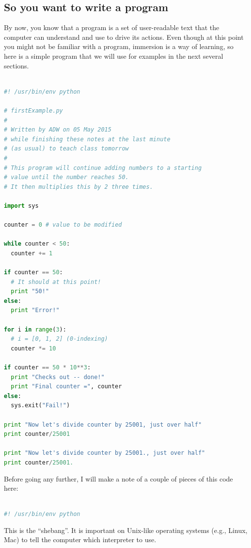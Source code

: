 \documentclass[a4paper,10pt]{scrartcl}
\begin{document}
\subsection{So you want to write a program}

By now, you know that a program is a set of user-readable text that the computer can understand and use to drive its actions. Even though at this point you might not be familiar with a program, immersion is a way of learning, so here is a simple program that we will use for examples in the next several sections.

\begin{lstlisting}[belowskip=-1.6\baselineskip, language=python]

#! /usr/bin/env python

# firstExample.py
# 
# Written by ADW on 05 May 2015
# while finishing these notes at the last minute
# (as usual) to teach class tomorrow
# 
# This program will continue adding numbers to a starting
# value until the number reaches 50.
# It then multiplies this by 2 three times.

import sys

counter = 0 # value to be modified

while counter < 50:
  counter += 1

if counter == 50:
  # It should at this point!
  print "50!"
else:
  print "Error!"
  
for i in range(3):
  # i = [0, 1, 2] (0-indexing)
  counter *= 10

if counter == 50 * 10**3:
  print "Checks out -- done!"
  print "Final counter =", counter
else:
  sys.exit("Fail!")
  
print "Now let's divide counter by 25001, just over half"
print counter/25001

print "Now let's divide counter by 25001., just over half"
print counter/25001.

\end{lstlisting}

Before going any further, I will make a note of a couple of pieces of this code here:
\begin{lstlisting}[belowskip=-1.6\baselineskip, language=python]

#! /usr/bin/env python
\end{lstlisting}
This is the ``shebang''. It is important on Unix-like operating systems (e.g., Linux, Mac) to tell the computer which interpreter to use.
\end{document}

